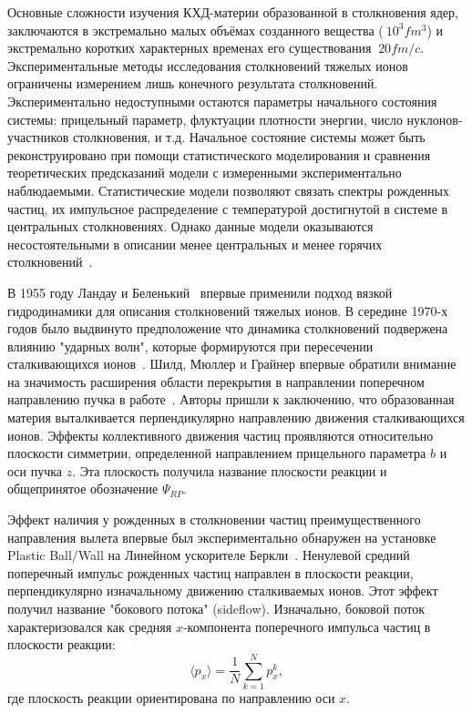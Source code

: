 Основные сложности изучения КХД-материи образованной в столкновения ядер, заключаются в экстремально малых объёмах созданного вещества ($~10^3 fm^3$) и экстремально коротких характерных временах его существования $~20fm/c$. 
Экспериментальные методы исследования столкновений тяжелых ионов ограничены измерением лишь конечного результата столкновений.
Экспериментально недоступными остаются параметры начального состояния системы: прицельный параметр, флуктуации плотности энергии, число нуклонов-участников столкновения, и т.д.
Начальное состояние системы может быть реконструировано при помощи статистического моделирования и сравнения теоретических предсказаний модели с измеренными экспериментально наблюдаемыми.
Статистические модели позволяют связать спектры рожденных частиц, их импульсное распределение с температурой достигнутой в системе в центральных столкновениях.
Однако данные модели оказываются несостоятельными в описании менее центральных и менее горячих столкновений~\cite{NA49:2004iqm, UA5:1981lmw}.

В 1955 году Ландау и Беленький~\cite{Belenkij:1955pgn} впервые применили подход вязкой гидродинамики для описания столкновений тяжелых ионов. 
В середине 1970-х годов было выдвинуто предположение что динамика столкновений подвержена влиянию "ударных волн", которые формируются при пересечении сталкивающихся ионов~\cite{Chapline:1973kkq}.
Шилд, Мюллер и Грайнер впервые обратили внимание на значимость расширения области перекрытия в направлении поперечном направлению пучка в работе~\cite{Scheid:1974zz}.
Авторы пришли к заключению, что образованная материя выталкивается перпендикулярно направлению движения сталкивающихся ионов. 
Эффекты коллективного движения частиц проявляются относительно плоскости симметрии, определенной направлением прицельного параметра $b$ и оси пучка $z$.
Эта плоскость получила название плоскости реакции и общепринятое обозначение $\Psi_{RP}$.

Эффект наличия у рожденных в столкновении частиц преимущественного направления вылета впервые был экспериментально обнаружен на установке Plastic Ball/Wall на Линейном ускорителе Беркли~\cite{Gustafsson:1984ka}. 
Ненулевой средний поперечный импульс рожденных частиц направлен в плоскости реакции, перпендикулярно изначальному движению сталкиваемых ионов.
Этот эффект получил название "бокового потока" (sideflow).
Изначально, боковой поток характеризовался как средняя $x$-компонента поперечного импульса частиц в плоскости реакции:
\begin{equation}
    \langle p_x \rangle = \frac{1}{N}{\sum_{k=1}^N p_x^k},
\end{equation}
где плоскость реакции ориентирована по направлению оси $x$.

